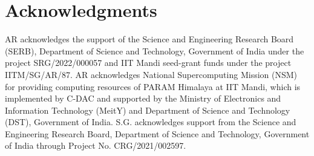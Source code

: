 \documentclass[pra,twocolumn,aps,superscriptaddress,showpacs,longbibliography]{revtex4-1}
\begin{document}



\section*{Acknowledgments}
AR acknowledges the support of the Science and Engineering Research Board (SERB), Department of Science and Technology, Government of India under the project SRG/2022/000057 and IIT Mandi seed-grant funds under the project IITM/SG/AR/87. AR acknowledges National Supercomputing Mission (NSM) for providing computing resources of PARAM Himalaya at IIT Mandi, which is implemented by C-DAC and supported by the Ministry of Electronics and Information Technology (MeitY) and Department of Science and Technology (DST), Government of India. S.G. acknowledges support from the Science and Engineering Research Board, Department
of Science and Technology, Government of India through Project No. CRG/2021/002597.
\end{document}
